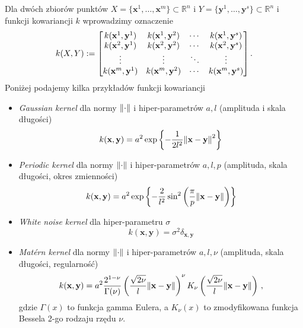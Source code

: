 \documentclass{myclass}
\numberwithin{equation}{subsection}
\begin{document}
Dla dwóch zbiorów punktów \(X = \{\mathbf{x}^1,\ldots,\mathbf{x}^m\} \subset \mathbb{R}^n\) i \(Y =
\{\mathbf{y}^1,\ldots,\mathbf{y}^s\} \subset \mathbb{R}^n\) i funkcji kowariancji \(k\) wprowadzimy
oznaczenie
\begin{equation}
    k(X,Y) := \mqty[k(\mathbf{x}^1, \mathbf{y}^1) & k(\mathbf{x}^1, \mathbf{y}^2) & \cdots & k(\mathbf{x}^1, \mathbf{y}^s)\\
    k(\mathbf{x}^2, \mathbf{y}^1) & k(\mathbf{x}^2, \mathbf{y}^2) & \cdots & k(\mathbf{x}^2, \mathbf{y}^s)\\
    \vdots & \vdots & \ddots & \vdots\\
    k(\mathbf{x}^m, \mathbf{y}^1) & k(\mathbf{x}^m, \mathbf{y}^2) & \cdots & k(\mathbf{x}^m, \mathbf{y}^s)\\]\,.
\end{equation}
Poniżej podajemy kilka przykładów funkcji kowariancji
\begin{itemize}
    \item \textit{Gaussian kernel} dla normy \(\norm{\cdot}\) i hiper-parametrów \(a,l\) (amplituda
    i skala długości)
    \begin{equation}
        k(\mathbf{x}, \mathbf{y}) = a^2\exp\left\{-\frac{1}{2l^2}\norm{\mathbf{x} - \mathbf{y}}^2\right\}
    \end{equation}
    
    \item \textit{Periodic kernel} dla normy \(\norm{\cdot}\) i hiper-parametrów \(a, l, p\)
    (amplituda, skala długości, okres zmienności)
    \begin{equation}
        k(\mathbf{x},\mathbf{y}) = a^2\exp\left\{-\frac{2}{l^2}\sin^2\left(\frac{\pi}{p}\norm{\mathbf{x} - \mathbf{y}}\right)\right\}
    \end{equation}

    \item \textit{White noise kernel} dla hiper-parametru \(\sigma\)
    \begin{equation}
        k(\mathbf{x},\mathbf{y}) = \sigma^2 \delta_{\mathbf{x},\mathbf{y}}
    \end{equation}

    \item \textit{Mat\'ern kernel} dla normy \(\norm{\cdot}\) i hiper-parametrów \(a, l, \nu\)
    (amplituda, skala długości, regularność)
    \begin{equation}
        k(\mathbf{x},\mathbf{y}) = a^2 \frac{2^{1-\nu}}{\Gamma(\nu)}\left(\frac{\sqrt{2\nu}}{l}\norm{\mathbf{x} - \mathbf{y}}\right)^\nu K_\nu\left(\frac{\sqrt{2\nu}}{l}\norm{\mathbf{x} - \mathbf{y}}\right)\,,
    \end{equation}
    gdzie \(\Gamma(x)\) to funkcja gamma Eulera, a \(K_\nu(x)\) to zmodyfikowana funkcja Bessela
    2-go rodzaju rzędu \(\nu\).

\end{itemize}
\end{document}
